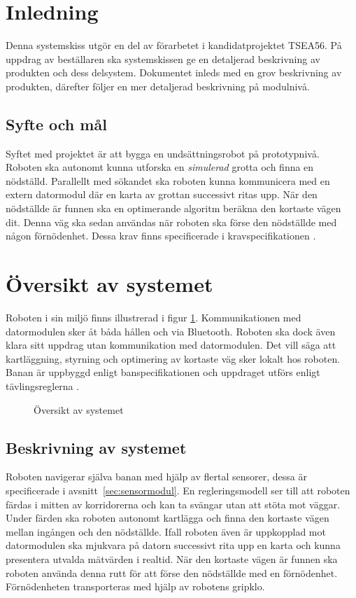 \documentclass[11pt]{article}
\begin{document}
\begin{flushleft}

\section{Inledning}
Denna systemskiss utgör en del av förarbetet i kandidatprojektet TSEA56. På uppdrag av beställaren ska systemskissen ge en detaljerad beskrivning av produkten och dess delsystem. Dokumentet inleds med en grov beskrivning av produkten, därefter följer en mer detaljerad beskrivning på modulnivå.
\subsection{Syfte och mål}
Syftet med projektet är att bygga en undsättningsrobot på prototypnivå. Roboten ska autonomt kunna utforska en \textit{simulerad} grotta och finna en nödställd. Parallellt med sökandet ska roboten kunna kommunicera med en extern datormodul där en karta av grottan successivt ritas upp. När den nödställde är funnen ska en optimerande algoritm beräkna den kortaste vägen dit. Denna väg ska sedan användas när roboten ska förse den nödställde med någon förnödenhet. Dessa krav finns specificerade i kravspecifikationen \cite{krav}.

\pagebreak
\section{Översikt av systemet}
Roboten i sin miljö finns illustrerad i figur \ref{system}. Kommunikationen med datormodulen sker åt båda hållen och via Bluetooth\textsuperscript{\circledR}. Roboten ska dock även klara sitt uppdrag utan kommunikation med datormodulen. Det vill säga att kartläggning, styrning och optimering av kortaste väg sker lokalt hos roboten. Banan är uppbyggd enligt banspecifikationen \cite{banspec} och uppdraget utförs enligt tävlingsreglerna \cite{tavling}.
\begin{figure}[htbp]
\centering
\noindent\resizebox{.8\linewidth}{!}{
	}
	\caption{Översikt av systemet \label{system}}	
\end{figure}


\subsection{Beskrivning av systemet}
Roboten navigerar själva banan med hjälp av flertal sensorer, dessa är specificerade i \mbox{avsnitt \ref{sec:sensormodul}}. En regleringsmodell ser till att roboten färdas i mitten av korridorerna och kan ta svängar utan att stöta mot väggar. Under färden ska roboten autonomt kartlägga och finna den kortaste vägen mellan ingången och den nödställde. Ifall roboten även är uppkopplad mot datormodulen ska mjukvara på datorn successivt rita upp en karta och kunna presentera utvalda mätvärden i realtid. När den kortaste vägen är funnen ska roboten använda denna rutt för att förse den nödställde med en förnödenhet. Förnödenheten transporteras med hjälp av robotens gripklo.


\end{flushleft}
\end{document}

